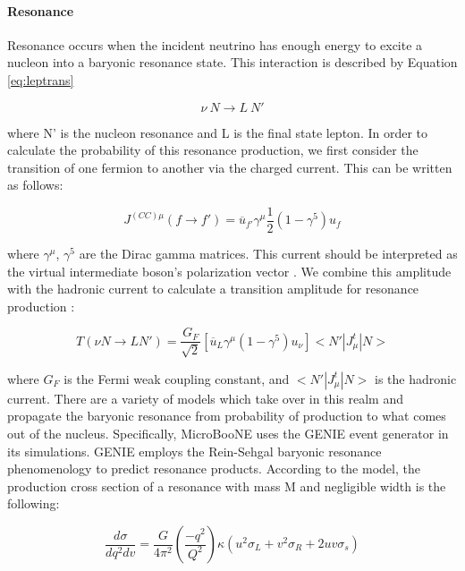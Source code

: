 \paragraph {Resonance}  Resonance occurs when the incident neutrino has enough energy to excite a nucleon into a baryonic resonance state. This interaction is described by Equation \ref{eq:leptrans} 

\begin{equation}
\label{eq:leptrans}
   \nu \ N \rightarrow L\ N'
\end{equation}

\noindent where N' is the nucleon resonance and L is the final state lepton. In order to calculate the probability of this resonance production, we first consider the transition of one fermion to another via the charged current. This can be written as follows:

\begin{equation}
   J^{(CC)\mu}(f \rightarrow f') =  \overline{u}_{f'}\gamma^\mu \frac{1}{2}(1 - \gamma^5)u_f
\end{equation}

\noindent where $\gamma^\mu$, $\gamma^5$ are the Dirac gamma matrices.  This current should be interpreted as the virtual intermediate boson's polarization vector  \cite{bib:rein_sehgal}.  We combine this amplitude with the hadronic current to calculate a transition amplitude for resonance production :

\begin{equation}
  T(\nu N \rightarrow L N') = \frac{G_F}{\sqrt{2}}[\overline{u}_L \gamma^\mu (1 - \gamma^5)u_\nu] <N'|J^t_\mu|N>
\end{equation}

\noindent where $G_F$ is the Fermi weak coupling constant, and $<N'|J^t_\mu|N>$ is the hadronic current.  There are a variety of models which take over in this realm and propagate the baryonic resonance from probability of production to what comes out of the nucleus.  Specifically, MicroBooNE uses the GENIE event generator \cite{bib:genie} in its simulations.  GENIE employs the Rein-Sehgal baryonic resonance phenomenology \cite{bib:rein_sehgal} to predict resonance products.  According to the model, the production cross section of a resonance with mass M and negligible width is the following:

\begin{equation}
  \frac{d\sigma}{dq^2dv} = \frac{G}{4\pi^2} (\frac{-q^2}{Q^2}) \kappa (u^2\sigma_L+v^2\sigma_R + 2uv\sigma_s)
\end{equation}

